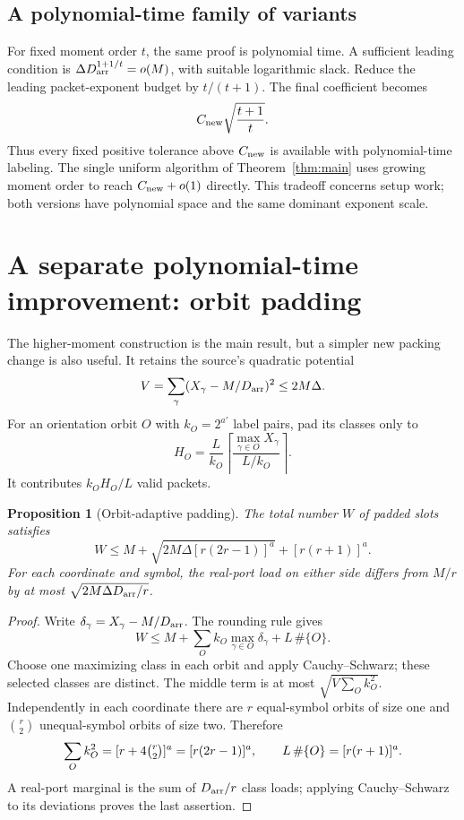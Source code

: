 \documentclass[11pt]{article}
\newtheorem{proposition}[theorem]{Proposition}
\theoremstyle{remark}\newtheorem{remark}[theorem]{Remark}
\newcommand{\Darr}{D_{\rm arr}}
\newcommand{\Cnew}{C_{\rm new}}
\begin{document}
\subsection{A polynomial-time family of variants}
For fixed moment order $t$, the same proof is polynomial time. A sufficient leading condition is $\Delta\Darr^{1+1/t}=o(M)$, with suitable logarithmic slack. Reduce the leading packet-exponent budget by $t/(t+1)$. The final coefficient becomes
\begin{equation}
 \Cnew\sqrt{\frac{t+1}{t}}.
 \label{eq:fixed-moment}
\end{equation}
Thus every fixed positive tolerance above $\Cnew$ is available with polynomial-time labeling. The single uniform algorithm of Theorem~\ref{thm:main} uses growing moment order to reach $\Cnew+o(1)$ directly. This tradeoff concerns setup work; both versions have polynomial space and the same dominant exponent scale.

\section{A separate polynomial-time improvement: orbit padding}
\label{sec:orbits}

The higher-moment construction is the main result, but a simpler new packing change is also useful. It retains the source's quadratic potential
\[
 V=\sum_\gamma(X_\gamma-M/\Darr)^2\le2M\Delta.
\]
For an orientation orbit $O$ with $k_O=2^{a'}$ label pairs, pad its classes only to
\[
 H_O=\frac{L}{k_O}
 \left\lceil\frac{\max_{\gamma\in O}X_\gamma}{L/k_O}\right\rceil.
\]
It contributes $k_OH_O/L$ valid packets.

\begin{proposition}[Orbit-adaptive padding]
\label{prop:orbit}
The total number $W$ of padded slots satisfies
\begin{equation}
 W\le M+\sqrt{2M\Delta[r(2r-1)]^a}+[r(r+1)]^a.
 \label{eq:orbit}
\end{equation}
For each coordinate and symbol, the real-port load on either side differs from $M/r$ by at most $\sqrt{2M\Delta\Darr/r}$.
\end{proposition}

\begin{proof}
Write $\delta_\gamma=X_\gamma-M/\Darr$. The rounding rule gives
\[
 W\le M+\sum_Ok_O\max_{\gamma\in O}\delta_\gamma
            +L\,\#\{O\}.
\]
Choose one maximizing class in each orbit and apply Cauchy--Schwarz; these selected classes are distinct. The middle term is at most $\sqrt{V\sum_Ok_O^2}$. Independently in each coordinate there are $r$ equal-symbol orbits of size one and $\binom r2$ unequal-symbol orbits of size two. Therefore
\[
 \sum_O k_O^2=[r+4\tbinom r2]^a=[r(2r-1)]^a,
 \qquad L\,\#\{O\}=[r(r+1)]^a.
\]
A real-port marginal is the sum of $\Darr/r$ class loads; applying Cauchy--Schwarz to its deviations proves the last assertion.
\end{proof}
\end{document}
